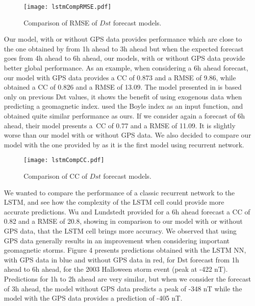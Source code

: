 \begin{figure}
	\texttt{[image: lstmCompRMSE.pdf]}
	\caption{Comparison of RMSE of $Dst$ forecast models.}
	\label{fig:lstmRMSE}
\end{figure}





Our model, with or without GPS data provides performance which are close to the one obtained by 
\citet{Lazzus} from 1h ahead to 3h ahead but when the expected forecast goes from 4h ahead to 6h ahead, 
our models, with or without GPS data provide better global performance. As an example, when considering a 6h 
ahead forecast, our model with GPS data provides a CC of 0.873 and a RMSE of 9.86, while \citet{Lazzus} 
obtained a CC of 0.826 and a RMSE of 13.09. The model presented in \citet{Lazzus} is based only on 
previous Dst values, it shows the benefit of using exogenous data when predicting a geomagnetic index. 
\citet{Bala2012} used the Boyle index as an input function, and obtained quite similar 
performance as ours. If we consider again a forecast of 6h ahead, their model presents a\ CC of 0.77 
and a RMSE of 11.09. It is slightly worse than our model with or without GPS data. We also decided to compare 
our model with the one provided by \citet{wu1997geomagnetic} as it is the first model using 
recurrent network. 

\begin{figure}
	\texttt{[image: lstmCompCC.pdf]}
	\caption{Comparison of CC of $Dst$ forecast models.}
	\label{fig:lstmCC}
\end{figure}


We wanted to compare the performance of a classic recurrent network to the LSTM, and see 
how the complexity of the LSTM cell could provide more accurate predictions. Wu and Lundstedt \citet{wu1997geomagnetic} 
provided for a 6h ahead forecast a CC of 0.82 and a RMSE of 20.8, showing in comparison to our model with or 
without GPS data, that the LSTM cell brings more accuracy. We observed that using GPS data generally results 
in an improvement when considering important geomagnetic storms. Figure 4 presents predictions obtained with 
the LSTM NN, with GPS data in blue and without GPS data in red, for Dst forecast from 1h ahead to 6h ahead, 
for the 2003 Halloween storm event (peak at -422 nT). Predictions for 1h to 2h ahead are very similar, but when 
we consider the forecast of 3h ahead, the model without GPS data predicts a peak of -348 nT while the model 
with the GPS data provides a prediction of -405 nT. 

